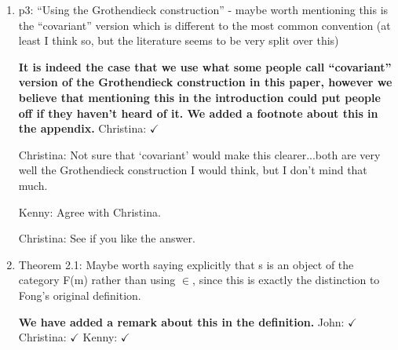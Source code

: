 \documentclass[reqno]{amsart}
\def\chris{\color{purple} Christina: }
\def\john{\color{red} John: }
\def\kenny{\color{blue} Kenny: }
\begin{document}
\begin{enumerate}




{\chris I made the above edit, see if you agree or change at will.}

\item p3: “Using the Grothendieck construction” - maybe worth mentioning this is the “covariant” version which is different to the most common 
convention 
(at least I think so, but the literature seems to be very split over this)

{\bf It is indeed the case that we use what some people call ``covariant'' version of the Grothendieck construction in this paper, however we believe 
that mentioning this in the introduction could put people off if they haven't heard of it. We added a footnote about this in the 
appendix.} {\chris $\checkmark$}

{\chris Not sure that `covariant' would make this clearer...both are very well the Grothendieck construction I would think, but I don't mind that 
much.}

{\kenny Agree with Christina.}

{\chris See if you like the answer.}

\item Theorem 2.1: Maybe worth saying explicitly that s is an object of the category F(m) rather than using $\in$, since this is exactly the 
distinction to 
Fong's original definition.

{\bf  We have added a remark about this in the definition.}   {\john $\checkmark$} {\chris $\checkmark$} {\kenny $\checkmark$}


\end{enumerate}
\end{document}
